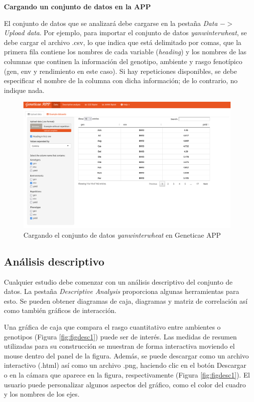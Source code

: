\textbf{Cargando un conjunto de datos en la APP}

El conjunto de datos que se analizará debe cargarse en la pestaña \emph{Data $->$ Upload data}. Por ejemplo, para importar el conjunto de datos \emph{yanwinterwheat}, se debe cargar el archivo .csv, lo que indica que está delimitado por comas, que la primera fila contiene los nombres de cada variable (\emph{heading}) y los nombres de las columnas que continen la información del genotipo, ambiente y rasgo fenotípico (gen, env y rendimiento en este caso). Si hay repeticiones disponibles, se debe especificar el nombre de la columna con dicha información; de lo contrario, no indique nada. 

 \begin{figure}[H]
	\begin{center}
		\includegraphics[width=16cm]{./Graficos/www/Data.png}
	\end{center}
	\caption{Cargando el conjunto de datos \emph{yanwinterwheat} en Geneticae APP}
	\label{fig:fig431}
\end{figure}


\subsection{Análisis descriptivo}

Cualquier estudio debe comenzar con un análisis descriptivo del conjunto de datos. La pestaña \emph{Descriptive Analysis} proporciona algunas herramientas para esto. Se pueden obtener diagramas de caja, diagramas y matriz de correlación así como también gráficos de interacción.

Una gráfica de caja que compara el rasgo cuantitativo entre ambientes o genotipos (Figura \ref{fig:figdesc1}) puede ser de interés. Las medidas de resumen utilizadas para su construcción se muestran de forma interactiva moviendo el mouse dentro del panel de la figura. Además, se puede descargar como un archivo interactivo (.html) así como un archivo .png, haciendo clic en el botón Descargar o en la cámara que aparece en la figura, respectivamente (Figura \ref{fig:figdesc1}). El usuario puede personalizar algunos aspectos del gráfico, como el color del cuadro y los nombres de los ejes. 

